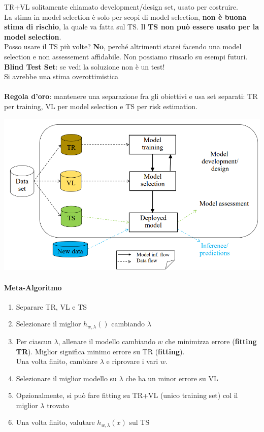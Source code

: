 \documentclass[10pt]{book}
\begin{document}
TR+VL solitamente chiamato development/design set, usato per costruire.\\
La stima in model selection è solo per scopi di model selection, \textbf{non è buona stima di rischio}, la quale va fatta sul TS. Il \textbf{TS non può essere usato per la model selection}.\\Posso usare il TS più volte? \textbf{No}, perché altrimenti starei facendo una model selection e non assessement affidabile. Non possiamo riusarlo su esempi futuri. \textbf{Blind Test Set}: se vedi la soluzione non è un test!\\Si avrebbe una stima overottimistica\\\\
\textbf{Regola d'oro}: mantenere una separazione fra gli obiettivi e usa set separati: TR per training, VL per model selection e TS per risk estimation.
\begin{center}
	\includegraphics[scale=0.55]{trvlts.png}
\end{center}
\paragraph{Meta-Algoritmo}
\begin{enumerate}
	\item Separare TR, VL e TS
	\item Selezionare il miglior $h_{w, \lambda}()$ cambiando $\lambda$
	\item Per ciascun $\lambda$, allenare il modello cambiando $w$ che minimizza errore (\textbf{fitting TR}). Miglior significa minimo errore su TR (\textbf{fitting}).\\Una volta finito, cambiare $\lambda$ e riprovare i vari $w$.
	\item Selezionare il miglior modello su $\lambda$ che ha un minor errore su VL
	\item Opzionalmente, si può fare fitting su TR+VL (unico training set) col il miglior $\lambda$ trovato
	\item Una volta finito, valutare $h_{w,\lambda}(x)$ sul TS
\end{enumerate}
\end{document}

